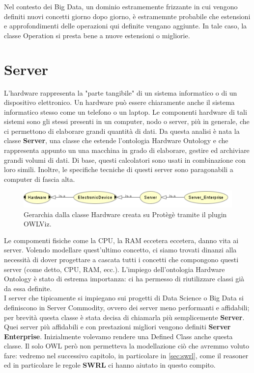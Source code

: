Nel contesto dei Big Data, un dominio estramemente frizzante in cui vengono definiti nuovi concetti giorno dopo giorno, è estramemnte probabile che estensioni e approfondimenti delle operazioni qui definite vengano aggiunte. In tale caso, la classe Operation si presta bene a nuove estensioni o migliorie.


\section{Server}
L'hardware rappresenta la "parte tangibile" di un sistema informatico o di un dispositivo elettronico. Un hardware può essere chiaramente anche il sistema informatico stesso come un telefono o un laptop. Le componenti hardware di tali sistemi sono gli stessi presenti in un computer, nodo o server, più in generale, che ci permettono di elaborare grandi quantità di dati. Da questa analisi è nata la classe \textbf{Server}, una classe che estende l'ontologia Hardware Ontology \cite{Hardware_Ontology} e che rappresenta appunto un una  macchina in grado di elaborare, gestire ed archiviare grandi volumi di dati. Di base, questi calcolatori sono usati in combinazione con loro simili. Inoltre, le specifiche tecniche di questi server sono paragonabili a computer di fascia alta.

\begin{figure}[H]
    \centering
    \includegraphics[width=12cm]{docs/images/bdhwowlviz.png}
    \caption{Gerarchia dalla classe Hardware creata su Protègè tramite il plugin OWLViz.}
    \label{fig:bdhw_graph}
\end{figure}

Le compomenti fisiche come la CPU, la RAM eccetera eccetera, danno vita ai server. Volendo modellare quest'ultimo concetto, ci siamo trovati dinanzi alla necessità di dover progettare a cascata tutti i concetti che compongono questi server (come detto, CPU, RAM, ecc.). L'impiego dell'ontologia Hardware Ontology \cite{Hardware_Ontology} è stato di estrema importanza: ci ha permesso di riutilizzare classi già da essa definite.\\
 
I server che tipicamente si impiegano sui progetti di Data Science o Big Data si definiscono in Server Commodity, ovvero dei server meno performanti e affidabili; per brevità questa classe è stata decisa di chiamarla più semplicemente \textbf{Server}. Quei server più affidabili e con prestazioni migliori vengono definiti \textbf{Server Enterprise}. Inizialmente volevamo rendere una Defined Class anche questa classe. Il solo OWL però non permetteva la modellazione ciò che avremmo voluto fare:  vedremo nel successivo capitolo, in particolare in \ref{sec:swrl}, come il reasoner ed in particolare le regole \textbf{SWRL} ci hanno aiutato in questo compito.